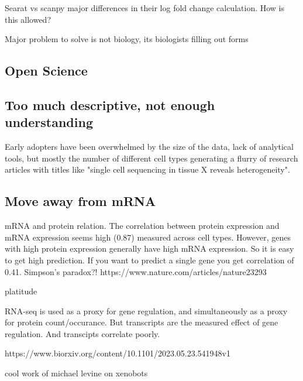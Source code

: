 Searat vs scanpy major differences in their log fold change calculation. How is this allowed?

Major problem to solve is not biology, its biologists filling out forms

\subsection{Open Science}



\subsection{Too much descriptive, not enough understanding}

Early adopters have been overwhelmed by the size of the data, lack of analytical tools, but mostly the number of different cell types generating a flurry of research articles with titles like "single cell sequencing in tissue X reveals heterogeneity".  

\subsection{Move away from mRNA}

mRNA and protein relation.
The correlation between protein expression and mRNA expression seems high (0.87) measured across cell types. However, genes with high protein expression generally have high mRNA expression. So it is easy to get high prediction. If you want to predict a single gene you get correlation of 0.41. Simpson's paradox?!
https://www.nature.com/articles/nature23293

platitude

RNA-seq is used as a proxy for gene regulation, and simultaneously as a proxy for protein count/occurance. But transcripts are the measured effect of gene regulation. And transcipts correlate poorly.

https://www.biorxiv.org/content/10.1101/2023.05.23.541948v1

cool work of michael levine on xenobots


